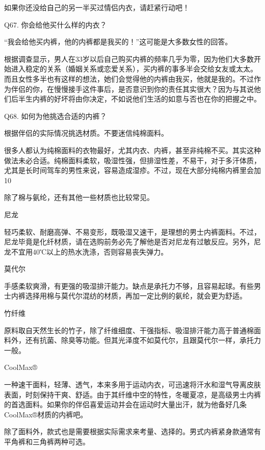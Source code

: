 \documentclass[12pt,UTF8]{ctexbook}
\begin{document}
如果你还没给自己的另一半买过情侣内衣，请赶紧行动吧！





Q67. 你会给他买什么样的内衣？


“我会给他买内裤，他的内裤都是我买的！”这可能是大多数女性的回答。

根据调查显示，男人在33岁以后自己购买内裤的频率几乎为零，因为他们大多数开始进入稳定的关系（婚姻关系或恋爱关系），买内裤的事多半会交给女友或太太。而且女性多半也有这样的想法，她们会觉得他的内裤由我买，他就是我的。不过作为伴侣的你，在慢慢接手这件事后，是否意识到你的责任其实很大？因为与其说他们后半生内裤的好坏将由你决定，不如说他们生活的如意与否也在你的把握之中。





Q68. 如何为他挑选合适的内裤？


根据伴侣的实际情况挑选材质。不要迷信纯棉面料。

很多人都认为纯棉面料的衣物最好，尤其内衣、内裤，甚至非纯棉不买。其实这种做法未必合适。纯棉面料柔软，吸湿性强，但排湿性差，不易干，对于多汗体质，尤其是长时间驾车的男性来说，容易造成湿疹。不过，现在大部分纯棉内裤里会加10%

除了棉与氨纶，还有其他一些材质也比较常见。

尼龙

轻巧柔软、耐磨高弹、不易变形，既吸湿又速干，是理想的男士内裤面料。不过，尼龙毕竟是化纤材质，请在选购前务必先了解他是否对尼龙有过敏反应。另外，尼龙不宜用40℃以上的热水洗涤，否则容易丧失弹力。

莫代尔

手感柔软爽滑，有更强的吸湿排汗能力。缺点是承托力不够，且容易起球。有些男士内裤选择用棉与莫代尔混纺的材质，再加一定比例的氨纶，就会更为舒适。

竹纤维

原料取自天然生长的竹子，除了纤维细度、干强指标、吸湿排汗能力高于普通棉面料外，还有抗菌、除臭等功能。但其光泽度不如莫代尔，且跟莫代尔一样，承托力一般。

CoolMax®

一种速干面料，轻薄、透气，本来多用于运动内衣，可迅速将汗水和湿气导离皮肤表面，时刻保持干爽、舒适。由于其纤维中空的特性，冬暖夏凉，是高级男士内裤的首选面料。如果你的伴侣喜爱运动并会在运动时大量出汗，就为他备好几条CoolMax®材质的内裤吧。

除了面料外，款式也是需要根据实际需求来考量、选择的。男式内裤紧身款通常有平角裤和三角裤两种可选。
\end{document}
